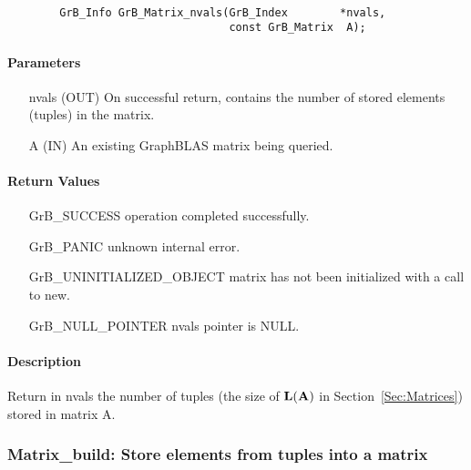 \paragraph{\syntax}

\begin{verbatim}
        GrB_Info GrB_Matrix_nvals(GrB_Index        *nvals,
                                  const GrB_Matrix  A);
\end{verbatim}

\paragraph{Parameters}

\begin{itemize}[leftmargin=1.1in]
    \item[{\sf nvals}] ({\sf OUT}) On successful return, contains the number of 
    stored elements (tuples) in the matrix.
    \item[{\sf A}] ({\sf IN}) An existing GraphBLAS matrix being queried.
\end{itemize}

\paragraph{Return Values}

\begin{itemize}[leftmargin=2.1in]
\item[{\sf GrB\_SUCCESS}]   operation completed successfully.
\item[{\sf GrB\_PANIC}]     unknown internal error.
\item[{\sf GrB\_UNINITIALIZED\_OBJECT}]  matrix has not been initialized with a call to {\sf new}.
\item[{\sf GrB\_NULL\_POINTER}]    {\sf nvals} pointer is {\sf NULL}.
\end{itemize}

\paragraph{Description}

Return in {\sf nvals} the number of tuples (the size of $\bold{L}({\bf A})$
in Section~\ref{Sec:Matrices}) stored in matrix {\sf A}.


\subsubsection{{\sf Matrix\_build}: Store elements from tuples into a matrix}
\label{Sec:Matrix_build}

